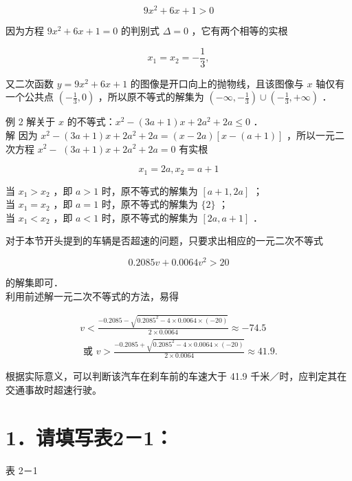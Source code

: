 \documentclass[10pt]{article}
\begin{document}
\[
9 x^{2}+6 x+1>0
\]

因为方程 \(9 x^{2}+6 x+1=0\) 的判别式 \(\Delta=0\) ，它有两个相等的实根

\[
x_{1}=x_{2}=-\frac{1}{3},
\]

又二次函数 \(y=9 x^{2}+6 x+1\) 的图像是开口向上的抛物线，且该图像与 \(x\) 轴仅有一个公共点 \(\left(-\frac{1}{3}, 0\right)\) ，所以原不等式的解集为 \(\left(-\infty,-\frac{1}{3}\right) \cup\left(-\frac{1}{3},+\infty\right)\) ．

例 2 解关于 \(x\) 的不等式：\(x^{2}-(3 a+1) x+2 a^{2}+2 a \leqslant 0\) ．\\
解 因为 \(x^{2}-(3 a+1) x+2 a^{2}+2 a=(x-2 a)[x-(a+1)]\) ，所以一元二次方程 \(x^{2}-\) \((3 a+1) x+2 a^{2}+2 a=0\) 有实根

\[
x_{1}=2 a, x_{2}=a+1
\]

当 \(x_{1}>x_{2}\) ，即 \(a>1\) 时，原不等式的解集为 \([a+1,2 a]\) ；\\
当 \(x_{1}=x_{2}\) ，即 \(a=1\) 时，原不等式的解集为 \(\{2\}\) ；\\
当 \(x_{1}<x_{2}\) ，即 \(a<1\) 时，原不等式的解集为 \([2 a, a+1]\) ．

对于本节开头提到的车辆是否超速的问题，只要求出相应的一元二次不等式

\[
0.2085 v+0.0064 v^{2}>20
\]

的解集即可．\\
利用前述解一元二次不等式的方法，易得

\[
\begin{gathered}
v<\frac{-0.2085-\sqrt{0.2085^{2}-4 \times 0.0064 \times(-20)}}{2 \times 0.0064} \approx-74.5 \\
\text { 或 } v>\frac{-0.2085+\sqrt{0.2085^{2}-4 \times 0.0064 \times(-20)}}{2 \times 0.0064} \approx 41.9 .
\end{gathered}
\]

根据实际意义，可以判断该汽车在刹车前的车速大于 41.9 千米／时，应判定其在交通事故时超速行驶。

\section*{1．请填写表2－1：}
表 2－1
\end{document}
